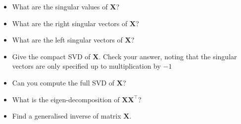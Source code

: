 \documentclass[]{book}
\providecommand{\tightlist}{%
  \setlength{\itemsep}{0pt}\setlength{\parskip}{0pt}}
\theoremstyle{definition}
\theoremstyle{definition}
\theoremstyle{definition}
\theoremstyle{remark}
\begin{document}
\begin{enumerate}
  \begin{itemize}
  \tightlist
  \item
    What are the singular values of \(\boldsymbol X\)?
  \item
    What are the right singular vectors of \(\boldsymbol X\)?
  \item
    What are the left singular vectors of \(\boldsymbol X\)?
  \item
    Give the compact SVD of \(\boldsymbol X\). Check your answer, noting that the singular vectors are only specified up to multiplication by \(-1\)
  \item
    Can you compute the full SVD of \(\boldsymbol X\)?
  \item
    What is the eigen-decomposition of \(\boldsymbol X\boldsymbol X^\top\)?
  \item
    Find a generalised inverse of matrix \(\boldsymbol X\).
  \end{itemize}
\end{enumerate}
\end{document}
